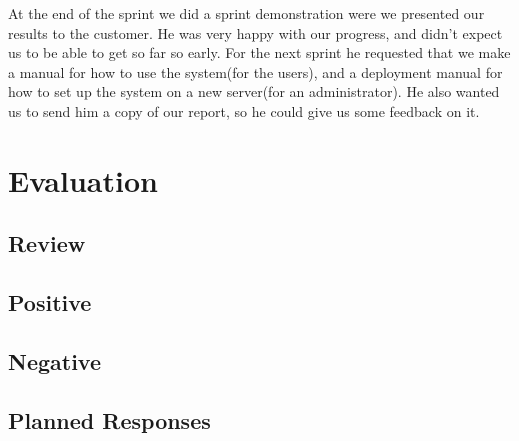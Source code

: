 \newline
\newline
At the end of the sprint we did a sprint demonstration were we presented our results to the customer. He was very happy with our progress, and didn't expect us to be able to get so far so early. For the next sprint he requested that we make a manual for how to use the system(for the users), and a deployment manual for how to set up the system on a new server(for an administrator). He also wanted us to send him a copy of our report, so he could give us some feedback on it.

\section{Evaluation}
\subsection{Review}
\subsection{Positive}
\subsection{Negative}
\subsection{Planned Responses}
